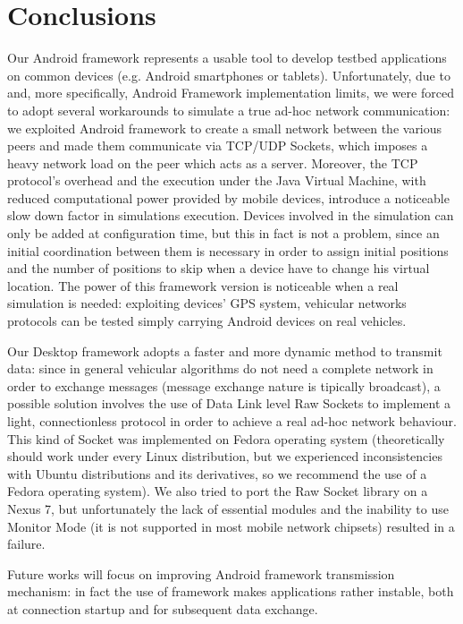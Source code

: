 \newpage
\section{Conclusions}

	Our Android framework represents a usable tool to develop testbed applications on common devices (e.g. Android smartphones or tablets). Unfortunately, due to \direct and, more specifically, Android \direct Framework implementation limits, we were forced to adopt several workarounds to simulate a true ad-hoc network communication: we exploited Android \direct framework to create a small network between the various peers and made them communicate via TCP/UDP Sockets, which imposes a heavy network load on the peer which acts as a server. Moreover, the TCP protocol's overhead and the execution under the Java Virtual Machine, with reduced computational power provided by mobile devices, introduce a noticeable slow down factor in simulations execution. 
	Devices involved in the simulation can only be added at configuration time, but this in fact is not a problem, since an initial coordination between them is necessary in order to assign initial positions and the number of positions to skip when a device have to change his virtual location. 
	The power of this framework version is noticeable when a real simulation is needed: exploiting devices' GPS system, vehicular networks protocols can be tested simply carrying Android devices on real vehicles. 
	
	Our Desktop framework adopts a faster and more dynamic method to transmit data: since in general vehicular algorithms do not need a complete network in order to exchange messages (message exchange nature is tipically broadcast), a possible solution involves the use of Data Link level Raw Sockets to implement a light, connectionless protocol in order to achieve a real ad-hoc network behaviour.%
	This kind of Socket was implemented on Fedora operating system (theoretically should work under every Linux distribution, but we experienced inconsistencies with Ubuntu distributions and its derivatives, so we recommend the use of a Fedora operating system). We also tried to port the Raw Socket library on a Nexus 7, but unfortunately the lack of essential modules and the inability to use Monitor Mode (it is not supported in most mobile network chipsets) resulted in a failure. 
	
	Future works will focus on improving Android framework transmission mechanism: in fact the use of \direct framework makes applications rather instable, both at connection startup and for subsequent data exchange.

